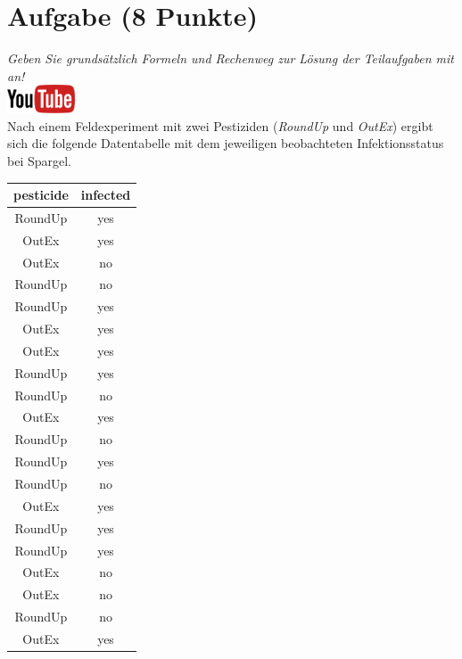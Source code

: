 \documentclass[a4paper, 10pt]{scrartcl}\usepackage[]{graphicx}\usepackage[]{xcolor}
\begin{document}
\section{Aufgabe \hfill (8 Punkte)}

\textit{Geben Sie grunds{\"a}tzlich Formeln und Rechenweg zur L{\"o}sung der
  Teilaufgaben mit an!} \\[1Ex]

\hfill\href{https://youtu.be/t_1KL77mfmg}{\includegraphics[width =
  2cm]{img/youtube}}\\[1Ex]

Nach einem Feldexperiment mit zwei Pestiziden (\textit{RoundUp} und
\textit{OutEx}) ergibt sich die folgende Datentabelle mit dem jeweiligen
beobachteten Infektionsstatus bei Spargel.

\begin{table}[!h]
\centering
\begin{tabular}{cc}
\toprule
pesticide & infected\\
\midrule
RoundUp & yes\\
OutEx & yes\\
OutEx & no\\
RoundUp & no\\
RoundUp & yes\\
\addlinespace
OutEx & yes\\
OutEx & yes\\
RoundUp & yes\\
RoundUp & no\\
OutEx & yes\\
\addlinespace
RoundUp & no\\
RoundUp & yes\\
RoundUp & no\\
OutEx & yes\\
RoundUp & yes\\
\addlinespace
RoundUp & yes\\
OutEx & no\\
OutEx & no\\
RoundUp & no\\
OutEx & yes\\
\bottomrule
\end{tabular}
\end{table}
\end{document}
